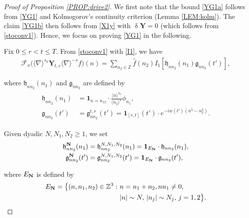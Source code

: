 \documentclass[letterpaper, 11pt,  reqno]{amsart}
\newcommand{\1}{\hspace{0.5mm}\textup{I}\hspace{0.5mm}}
\newcommand{\noi}{\noindent}
\newcommand{\Z}{\mathbb{Z}}
\newcommand{\updl}{\updelta}
\newcommand{\nb}{\nabla}
\newcommand{\ft}{\widehat}
\newcommand{\Ft}{{\mathcal{F}}}
\newcommand{\jb}[1]
{\langle #1 \rangle}
\newcommand{\ind}{\mathbf 1}
\newcommand{\YY}{\mathbf{Y}}
\newcommand{\hf}{\mathfrak{h}}
\newcommand{\ff}{\mathfrak{g}}
\numberwithin{equation}{section}
\numberwithin{theorem}{section}
\begin{document}
\begin{proof}[Proof of Proposition \ref{PROP:drive2}]
We first note that the bound \eqref{YG1a} follows from \eqref{YG1} and
Kolmogorov's continuity criterion (Lemma \ref{LEM:kolm}).
The claim \eqref{YG1b}
then follows from \eqref{X1y}
with $\updl \YY = 0$
(which follows from \eqref{stoconv1}).
Hence, we focus on proving 
\eqref{YG1} in the following.




Fix  $0 \le r <  t \le T$.
From \eqref{stoconv1} with \eqref{I1}, we have 
\begin{align}
\Ft_x\big(\jb{\nb}^{s_0}\YY_{t,r} \jb{\nb}^{-s}f \big)(n) 
=  \sum_{n_2\in \Z} \ft f (n_2) I_1[ \hf_{nn_2}(n_1) \ff_{nn_2}(t') ] , 
\label{YG2}
\end{align}

\noi
where $\hf_{nn_2}(n_1) $ and $\ff_{nn_2}$ are defined by 
\begin{align}
\begin{split}
\hf_{n n_2}(n_1) & = 
 \ind_{n=n_{12}}
\cdot
\frac{\jb{n}^{s_0}}{\jb{n_2}^{s}} \phi_{n_1} , \\
\ff_{nn_2} (t')  &= 
\ff_{nn_2}^{t, r} (t')= 
 \ind_{[r, t]}(t')\cdot 
 e^{- i w(t') (n^3 - n_2^3)}.
\end{split}
\label{YG3}
\end{align}



\noi
Given dyadic $N, N_1, N_2 \ge1$, we set 
\begin{align}
\begin{split}
\hf^{\bf N}_{n n_2}(n_1) & = 
\hf^{N, N_1, N_2}_{n n_2}(n_1)
= \ind_{E_{\bf N}}
\cdot 
 \hf_{n n_2}(n_1), \\
\ff^{\bf N}_{nn_2} (t')  &= 
\ff^{N, N_1, N_2}_{nn_2} (t')  = 
\ind_{E_{\bf N}}
\cdot 
\ff_{nn_2} (t'),  
\end{split}
\label{YG3a}
\end{align}


\noi
where $E_{\bf N}$ is defined by 
\begin{align}
\begin{split}
E_{\bf N} = \big\{(n, n_1, n_2) \in \Z^3:
\ &  n = n_1 + n_2, 
n n_1 \ne 0,\\
& 
 |n|\sim N, \, |n_j|\sim N_j, \, j = 1, 2\big\}.
\end{split}
\label{EN1}
\end{align}


\end{proof}
\end{document}
